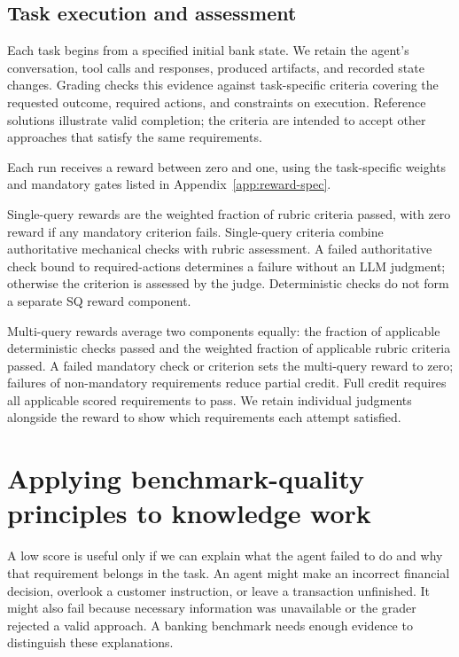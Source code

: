 \documentclass[11pt,letterpaper]{article}
\begin{document}
\subsection{Task execution and assessment}
Each task begins from a specified initial bank state. We retain the agent's conversation, tool calls and responses, produced artifacts, and recorded state changes. Grading checks this evidence against task-specific criteria covering the requested outcome, required actions, and constraints on execution. Reference solutions illustrate valid completion; the criteria are intended to accept other approaches that satisfy the same requirements.

Each run receives a reward between zero and one, using the task-specific weights and mandatory gates listed in Appendix~\ref{app:reward-spec}.

Single-query rewards are the weighted fraction of rubric criteria passed, with zero reward if any mandatory criterion fails. Single-query criteria combine authoritative mechanical checks with rubric assessment. A failed authoritative check bound to required-actions determines a failure without an LLM judgment; otherwise the criterion is assessed by the judge. Deterministic checks do not form a separate SQ reward component.

Multi-query rewards average two components equally: the fraction of applicable deterministic checks passed and the weighted fraction of applicable rubric criteria passed. A failed mandatory check or criterion sets the multi-query reward to zero; failures of non-mandatory requirements reduce partial credit. Full credit requires all applicable scored requirements to pass. We retain individual judgments alongside the reward to show which requirements each attempt satisfied.

\section{Applying benchmark-quality principles to knowledge work}\label{sec:standard}

A low score is useful only if we can explain what the agent failed to do and why that requirement belongs in the task. An agent might make an incorrect financial decision, overlook a customer instruction, or leave a transaction unfinished. It might also fail because necessary information was unavailable or the grader rejected a valid approach. A banking benchmark needs enough evidence to distinguish these explanations.
\end{document}
